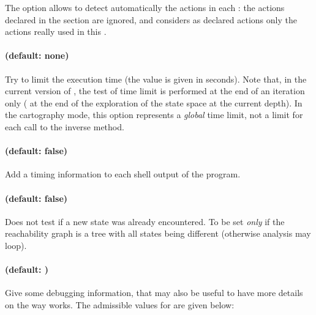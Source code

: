The option  allows to detect automatically the actions in each \IPTA{}: the actions declared in the  section are ignored, and \imitator{} considers as declared actions only the actions really used in this \IPTA{}.


\paragraph{ (default: none)}
Try to limit the execution time (the value  is given in seconds).
Note that, in the current version of \imitator{}, the test of time limit is performed at the end of an iteration only (\ie{} at the end of the exploration of the state space at the current depth).
In the cartography mode, this option represents a \emph{global} time limit, not a limit for each call to the inverse method.


\paragraph{ (default: false)}
Add a timing information to each shell output of the program.



\paragraph{ (default: false)}
Does not test if a new state was already encountered.
To be set \emph{only} if the reachability graph is a tree with all states being different (otherwise analysis may loop). 




\paragraph{ (default: )}

Give some debugging information, that may also be useful to have more details on the way \imitator{} works.
The admissible values for  are given below:

